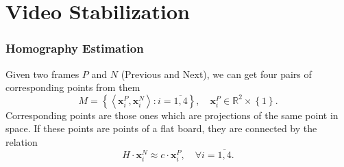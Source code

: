 \section{Video Stabilization}
\begin{frame}
  \frametitle{Homography Estimation}
  Given two frames $P$ and $N$ (Previous and Next),
  we can get four pairs of corresponding points from them
  \begin{equation}
    \label{eq:corresponding-points}
    M = \left\{
      \left\langle \boldsymbol{x}_i^P, \boldsymbol{x}_i^N \right\rangle: i = \overline{1, 4}
    \right\},
    \quad \boldsymbol{x}_i^P \in \mathbb{R}^2 \times \left\{ 1 \right\}.
  \end{equation}
  Corresponding points are those ones which are projections of the same point in space.
  If these points are points of a flat board, they are connected by the relation
  \begin{equation}
    \label{eq:homogrpahy}
    H \cdot \boldsymbol{x}_i^N \approx c \cdot \boldsymbol{x}_i^P,
    \quad \forall i = \overline{1, 4}.
  \end{equation}
\end{frame}
